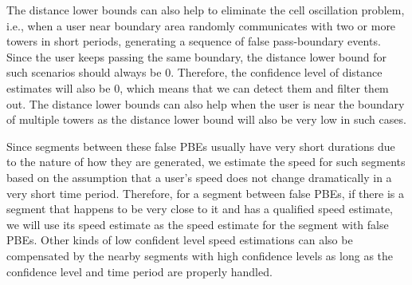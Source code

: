 The distance lower bounds can also help to eliminate the cell oscillation problem, i.e., when a user near boundary area randomly communicates with two or more towers in short periods, generating a sequence of false pass-boundary events. Since the user keeps passing the same boundary, the distance lower bound for such scenarios should always be $0$. Therefore, the confidence level of distance estimates will also be $0$, which means that we can detect them and filter them out. The distance lower bounds can also help when the user is near the boundary of multiple towers as the distance lower bound will also be very low in such cases.

Since segments between these false PBEs usually have very short durations due to the nature of how they are generated, we estimate the speed for such segments based on the assumption that a user's speed does not change dramatically in a very short time period. Therefore, for a segment between false PBEs, if there is a segment that happens to be very close to it and has a qualified speed estimate,  we will use its speed estimate as the speed estimate for the segment with false PBEs. Other kinds of low confident level speed estimations can also be compensated by the nearby segments with high confidence levels as long as the confidence level and time period are properly handled.
 

